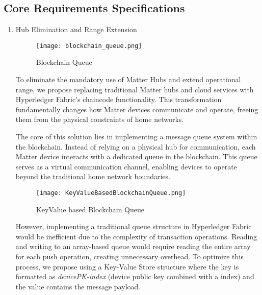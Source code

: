 \documentclass[conference]{IEEEtran}
\begin{document}
\subsection{Core Requirements Specifications}

\begin{enumerate}[itemsep=2ex, parsep=1ex]
	\item Hub Elimination and Range Extension
	      	      
	      \begin{figure} [h!]
	      	\centering
	      	\texttt{[image: blockchain\_queue.png]}
	      	\caption{Blockchain Queue}
	      	\label{fig:blockchain_queue}
	      \end{figure}
	      	      	      
	      To eliminate the mandatory use of Matter Hubs and extend operational range,
	      we propose replacing traditional Matter hubs and cloud services with Hyperledger          Fabric's chaincode functionality. This transformation fundamentally changes how Matter
	      devices communicate and operate, freeing them from the physical constraints
	      of home networks.
	      	      	      
	      The core of this solution lies in implementing a message queue system within
	      the blockchain. Instead of relying on a physical hub for communication, each
	      Matter device interacts with a dedicated queue in the blockchain. This
	      queue serves as a virtual communication channel, enabling devices to operate
	      beyond the traditional home network boundaries.
	      	      	      
	      \begin{figure}[h!]
	      	\centering
	      	\texttt{[image: KeyValueBasedBlockchainQueue.png]}
	      	\caption{Key\-Value based Blockchain Queue}
	      	\label{fig:KeyValueBasedBlockchainQueue}
	      \end{figure}
	      	      	      
	      However, implementing a traditional queue structure in Hyperledger Fabric
	      would be inefficient due to the complexity of transaction operations. Reading
	      and writing to an array-based queue would require reading the entire array
	      for each push operation, creating unnecessary overhead. To optimize this process,
	      we propose using a Key-Value Store structure where the key is formatted as
	      \emph{devicePK-index} (device public key combined with a index) and
	      the value contains the message payload.
	      	      	      

\end{enumerate}
\end{document}
